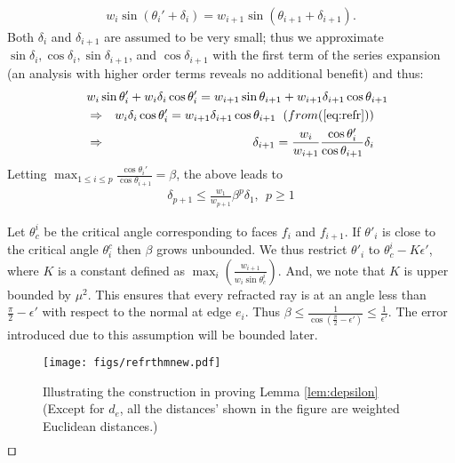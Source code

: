 \documentclass[11pt]{article}
\def\qed{\hbox{\rlap{$\sqcap$}$\sqcup$}}
\newenvironment{proof}{\par\noindent{\bf Proof:}}{\mbox{}\hfill$\qed$\\}
\begin{document}
\begin{proof}
\begin{eqnarray}
{w_i\sin{(\theta_i'+\delta_i)}=w_{i+1}\sin{(\theta_{i+1}+\delta_{i+1})}}.  \nonumber
\end{eqnarray} 
Both $\delta_i$ and $\delta_{i+1}$ are assumed to be very small; thus we approximate $\sin{\delta_i}, \cos{\delta_i}, \sin{\delta_{i+1}}$, and $\cos{\delta_{i+1}}$ with the first term of the series expansion (an analysis with higher order  terms reveals no additional benefit) and thus:
\begin{eqnarray}
\lefteqn{w_i\sin{\theta_i'}+w_i\delta_i\cos{\theta_i'} = w_{i+1}\sin{\theta_{i+1}}+w_{i+1}\delta_{i+1}\cos{\theta_{i+1}}} \nonumber \\
& \Rightarrow & w_i\delta_i\cos{\theta_i'}=w_{i+1}\delta_{i+1}\cos{\theta_{i+1}}  \hspace{0.08in} (from (\ref{eq:refr})) \nonumber \\
& \Rightarrow & \delta_{i+1}=\frac{w_i}{w_{i+1}}\frac{\cos{\theta_i'}}{\cos{\theta_{i+1}}}\delta_i  \label{eq:delta}
\end{eqnarray}
Letting $\max_{1\leq i \leq p} \frac{\cos{\theta_i'}}{\cos{\theta_{i+1}}}
 = \beta$, the above leads to  
\begin{eqnarray}
\delta_{p+1} \le \frac{w_1}{w_{p+1}}\beta^p\delta_1  ,  \ \  p \geq 1\label{eq:deltan}
\end{eqnarray}

Let $\theta^i_c$ be the critical angle corresponding to faces $f_i$ and $f_{i+1}$.
If $\theta'_i $ is close to the critical angle $\theta^c_i$ then $\beta$ grows unbounded. 
We thus restrict $\theta'_i$ to $\theta^i_c - K\epsilon'$, where $K$ is a constant defined as $\max_i(\frac{w_{i+1}}{w_i \sin \theta^i_c})$. 
And, we note that $K$ is upper bounded by $\mu^2$.
This ensures that every refracted ray is at an angle less than $\frac{\pi}{2} - \epsilon'$ with respect to the normal at edge $e_i$.
Thus $\beta \leq \frac{1}{\cos(\frac{\pi}{2} - \epsilon')} \leq \frac{1}{\epsilon'}$.
The error introduced due to this assumption will be bounded later.

\begin{figure}[h]
\begin{minipage}[t]{\linewidth}
\begin{center}
\texttt{[image: figs/refrthmnew.pdf]}
\caption{\footnotesize
Illustrating the construction in proving Lemma \ref{lem:depsilon}
\scriptsize{}
(Except for $d_e$, all the distances' shown in the figure are weighted Euclidean distances.)
\normalsize{}
}
\label{fig:refrthm}
\end{center}
\end{minipage}
\vspace*{-0.1in}
\end{figure}


\end{proof}
\end{document}
